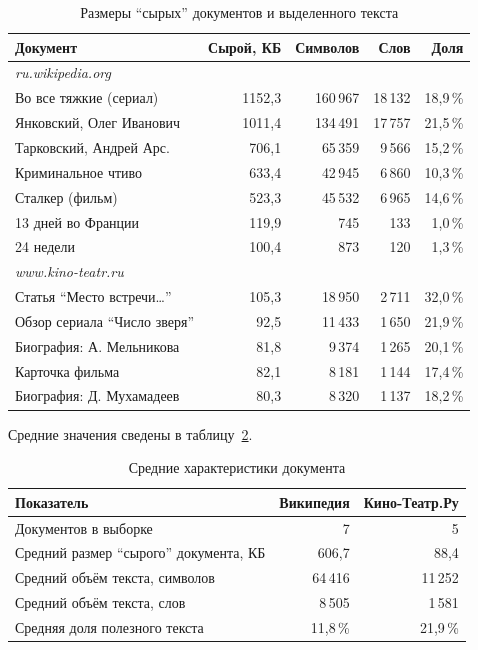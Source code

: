 \begin{table}[h]
\centering
\begin{tabular}{|l|r|r|r|r|}
\hline
\textbf{Документ} & \textbf{Сырой, КБ} & \textbf{Символов} & \textbf{Слов} & \textbf{Доля} \\
\hline
\multicolumn{5}{|l|}{\textit{ru.wikipedia.org}} \\
\hline
Во все тяжкие (сериал)      & 1152,3 & 160\,967 & 18\,132 & 18,9\,\% \\
Янковский, Олег Иванович    & 1011,4 & 134\,491 & 17\,757 & 21,5\,\% \\
Тарковский, Андрей Арс.     &  706,1 &  65\,359 &  9\,566 & 15,2\,\% \\
Криминальное чтиво          &  633,4 &  42\,945 &  6\,860 & 10,3\,\% \\
Сталкер (фильм)             &  523,3 &  45\,532 &  6\,965 & 14,6\,\% \\
13 дней во Франции          &  119,9 &     745 &     133 &  1,0\,\% \\
24 недели                   &  100,4 &     873 &     120 &  1,3\,\% \\
\hline
\multicolumn{5}{|l|}{\textit{www.kino-teatr.ru}} \\
\hline
Статья \enquote{Место встречи\ldots} & 105,3 & 18\,950 & 2\,711 & 32,0\,\% \\
Обзор сериала \enquote{Число зверя}  &  92,5 & 11\,433 & 1\,650 & 21,9\,\% \\
Биография: А. Мельникова             &  81,8 &  9\,374 & 1\,265 & 20,1\,\% \\
Карточка фильма                      &  82,1 &  8\,181 & 1\,144 & 17,4\,\% \\
Биография: Д. Мухамадеев             &  80,3 &  8\,320 & 1\,137 & 18,2\,\% \\
\hline
\end{tabular}
\caption{Размеры \enquote{сырых} документов и выделенного текста}
\label{tab:sizes}
\end{table}

Средние значения сведены в таблицу~\ref{tab:avg}.

\begin{table}[h]
\centering
\begin{tabular}{|l|r|r|}
\hline
\textbf{Показатель} & \textbf{Википедия} & \textbf{Кино-Театр.Ру} \\
\hline
Документов в выборке                          &       7 &       5 \\
Средний размер \enquote{сырого} документа, КБ &   606,7 &    88,4 \\
Средний объём текста, символов                & 64\,416 & 11\,252 \\
Средний объём текста, слов                    &  8\,505 &  1\,581 \\
Средняя доля полезного текста                 & 11,8\,\% & 21,9\,\% \\
\hline
\end{tabular}
\caption{Средние характеристики документа}
\label{tab:avg}
\end{table}

